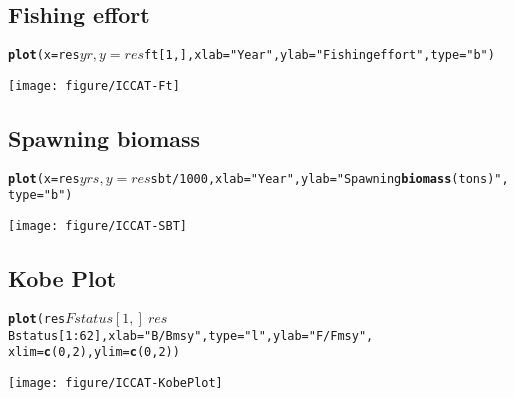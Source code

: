 \documentclass[a4paper]{article}\usepackage{graphicx, color}
\makeatletter
\def\maxwidth{ %
  \ifdim\Gin@nat@width>\linewidth
    \linewidth
  \else
    \Gin@nat@width
  \fi
}
\newcommand{\hlfunctioncall}[1]{\textcolor[rgb]{0.501960784313725,0,0.329411764705882}{\textbf{#1}}}%
\newcommand{\hlstring}[1]{\textcolor[rgb]{0.6,0.6,1}{#1}}%
\newenvironment{kframe}{%
 \def\at@end@of@kframe{}%
 \ifinner\ifhmode%
  \def\at@end@of@kframe{\end{minipage}}%
  \begin{minipage}{\columnwidth}%
 \fi\fi%
 \def\FrameCommand##1{\hskip\@totalleftmargin \hskip-\fboxsep
 \colorbox{shadecolor}{##1}\hskip-\fboxsep
     \hskip-\linewidth \hskip-\@totalleftmargin \hskip\columnwidth}%
 \MakeFramed {\advance\hsize-\width
   \@totalleftmargin\z@ \linewidth\hsize
   \@setminipage}}%
 {\par\unskip\endMakeFramed%
 \at@end@of@kframe}
\newenvironment{knitrout}{}{} %
\makeatother
\begin{document}
\subsection{Fishing effort}
\begin{knitrout}
\color{fgcolor}\begin{kframe}
\begin{alltt}
\hlfunctioncall{plot}(x = res$yr, y = res$ft[1, ], xlab = \hlstring{"Year"}, ylab = \hlstring{"Fishing effort"}, type = \hlstring{"b"})
\end{alltt}
\end{kframe}

{\centering \texttt{[image: figure/ICCAT-Ft]} 

}



\end{knitrout}


\subsection{Spawning biomass}
\begin{knitrout}
\color{fgcolor}\begin{kframe}
\begin{alltt}
\hlfunctioncall{plot}(x = res$yrs, y = res$sbt/1000, xlab = \hlstring{"Year"}, ylab = \hlstring{"Spawning \hlfunctioncall{biomass} (tons)"}, 
    type = \hlstring{"b"})
\end{alltt}
\end{kframe}

{\centering \texttt{[image: figure/ICCAT-SBT]} 

}



\end{knitrout}


\subsection{Kobe Plot}
\begin{knitrout}
\color{fgcolor}\begin{kframe}
\begin{alltt}
\hlfunctioncall{plot}(res$Fstatus[1, ] ~ res$Bstatus[1:62], xlab = \hlstring{"B/Bmsy"}, type = \hlstring{"l"}, ylab = \hlstring{"F/Fmsy"}, 
    xlim = \hlfunctioncall{c}(0, 2), ylim = \hlfunctioncall{c}(0, 2))
\end{alltt}
\end{kframe}

{\centering \texttt{[image: figure/ICCAT-KobePlot]} 

}



\end{knitrout}
\end{document}
